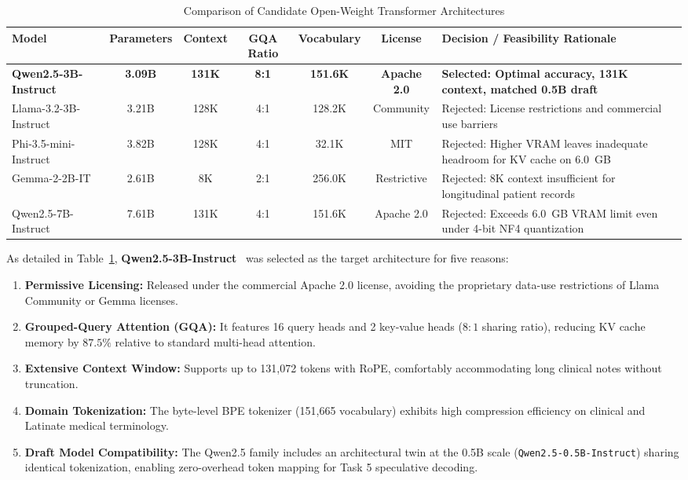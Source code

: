 \documentclass[conference]{IEEEtran}
\begin{document}
\begin{table}[t]
\caption{Comparison of Candidate Open-Weight Transformer Architectures}
\label{tab:model_comparison}
\centering
\small
\begin{tabularx}{\textwidth}{lcccccX}
\toprule
\textbf{Model} & \textbf{Parameters} & \textbf{Context} & \textbf{GQA Ratio} & \textbf{Vocabulary} & \textbf{License} & \textbf{Decision / Feasibility Rationale} \\
\midrule
\textbf{Qwen2.5-3B-Instruct} & \textbf{3.09B} & \textbf{131K} & \textbf{8:1} & \textbf{151.6K} & \textbf{Apache 2.0} & \textbf{Selected: Optimal accuracy, 131K context, matched 0.5B draft} \\
Llama-3.2-3B-Instruct & 3.21B & 128K & 4:1 & 128.2K & Community & Rejected: License restrictions and commercial use barriers \\
Phi-3.5-mini-Instruct & 3.82B & 128K & 4:1 & 32.1K & MIT & Rejected: Higher VRAM leaves inadequate headroom for KV cache on 6.0~GB \\
Gemma-2-2B-IT & 2.61B & 8K & 2:1 & 256.0K & Restrictive & Rejected: 8K context insufficient for longitudinal patient records \\
Qwen2.5-7B-Instruct & 7.61B & 131K & 4:1 & 151.6K & Apache 2.0 & Rejected: Exceeds 6.0~GB VRAM limit even under 4-bit NF4 quantization \\
\bottomrule
\end{tabularx}
\end{table}

As detailed in Table~\ref{tab:model_comparison}, \textbf{Qwen2.5-3B-Instruct}~\cite{qwen2024qwen25} was selected as the target architecture for five reasons:
\begin{enumerate}
    \item \textbf{Permissive Licensing:} Released under the commercial Apache 2.0 license, avoiding the proprietary data-use restrictions of Llama Community or Gemma licenses.
    \item \textbf{Grouped-Query Attention (GQA):} It features 16 query heads and 2 key-value heads ($8:1$ sharing ratio), reducing KV cache memory by $87.5\%$ relative to standard multi-head attention.
    \item \textbf{Extensive Context Window:} Supports up to 131,072 tokens with RoPE, comfortably accommodating long clinical notes without truncation.
    \item \textbf{Domain Tokenization:} The byte-level BPE tokenizer (151,665 vocabulary) exhibits high compression efficiency on clinical and Latinate medical terminology.
    \item \textbf{Draft Model Compatibility:} The Qwen2.5 family includes an architectural twin at the 0.5B scale (\texttt{Qwen2.5-0.5B-Instruct}) sharing identical tokenization, enabling zero-overhead token mapping for Task 5 speculative decoding.
\end{enumerate}
\end{document}
